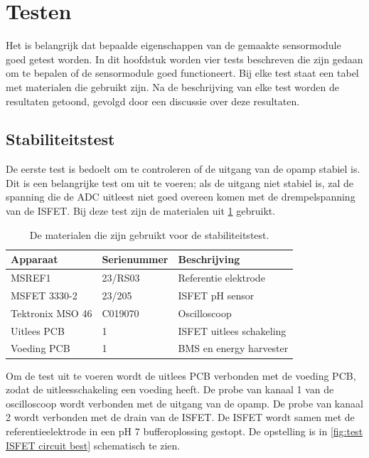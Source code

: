 \section{Testen}\label{sec:test}

Het is belangrijk dat bepaalde eigenschappen van de gemaakte sensormodule goed getest worden. In dit hoofdstuk worden vier tests beschreven die zijn gedaan om te bepalen of de sensormodule goed functioneert. Bij elke test staat een tabel met materialen die gebruikt zijn. Na de beschrijving van elke test worden de resultaten getoond, gevolgd door een discussie over deze resultaten.


\subsection{Stabiliteitstest}\label{sec:stabiliteitstest}
De eerste test is bedoelt om te controleren of de uitgang van de opamp stabiel is. Dit is een belangrijke test om uit te voeren; als de uitgang niet stabiel is, zal de spanning die de ADC uitleest niet goed overeen komen met de drempelspanning van de ISFET.
Bij deze test zijn de materialen uit \cref{tab:testMaterialen1} gebruikt.
\begin{table}[!htbp]
    \centering
    \begin{tabular}{l|l|l}
        Apparaat         & Serienummer & Beschrijving \\
        \hline
        MSREF1           & 23/RS03     & Referentie elektrode       \\
        MSFET 3330-2     & 23/205      & ISFET pH sensor            \\
        Tektronix MSO 46 & C019070     & Oscilloscoop               \\
        Uitlees PCB      & 1           & ISFET uitlees schakeling   \\
        Voeding PCB      & 1           & BMS en energy harvester    \\
        \hline
    \end{tabular}
    \caption{De materialen die zijn gebruikt voor de stabiliteitstest.}
    \label{tab:testMaterialen1}
\end{table}

Om de test uit te voeren wordt de uitlees PCB verbonden met de voeding PCB, zodat de uitleesschakeling een voeding heeft. De probe van kanaal 1 van de oscilloscoop wordt verbonden met de uitgang van de opamp. De probe van kanaal 2 wordt verbonden met de drain van de ISFET. De ISFET wordt samen met de referentieelektrode in een pH 7 bufferoplossing gestopt. De opstelling is in \cref{fig:test ISFET circuit best} schematisch te zien.

